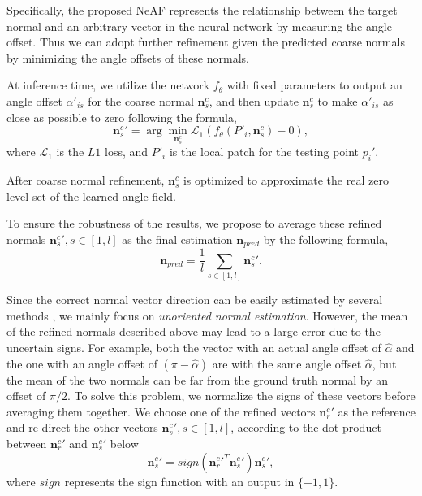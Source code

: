 \documentclass[letterpaper]{article} \usepackage{aaai23}  \usepackage{times}  \usepackage{helvet}  \usepackage{courier}  \usepackage[hyphens]{url}  \usepackage{graphicx} \urlstyle{rm} \def\UrlFont{\rm}  \usepackage{natbib}  \usepackage{caption} \frenchspacing  \setlength{\pdfpagewidth}{8.5in} \setlength{\pdfpageheight}{11in} \usepackage{algorithm}
\begin{document}
Specifically, the proposed NeAF represents the relationship between the target normal and an arbitrary vector in the neural network by measuring the angle offset. Thus we can adopt further refinement given the predicted coarse normals by minimizing the angle offsets of these normals.

At inference time, we utilize the network $f_{\theta}$ with fixed parameters to output an angle offset $\alpha'_{is} $ for the coarse normal $\boldsymbol{n}^c_s$, and then update $\boldsymbol{n}^c_s$ to make $\alpha'_{is}$ as close as possible to zero following the formula,
\begin{equation}
\label{eq:optimization}
    {\boldsymbol{n}^c_s}' = \arg \min \limits_{\boldsymbol{n}^c_s} \mathcal{L}_1(f_{\theta}(P'_i, \boldsymbol{n}^c_s)-0),
\end{equation}
where $\mathcal{L}_1$ is the $L1$ loss, and $P'_i$ is the local patch for the testing point $p_i'$.

After coarse normal refinement, $\boldsymbol{n}^c_s$ is optimized to approximate the real zero level-set of the learned angle field. 

To ensure the robustness of the results, we propose to average these refined normals ${{\boldsymbol{n}}^c_s}', s\in[1,l]$ as the final estimation $\boldsymbol{n}_{pred}$ by the following formula,
\begin{equation}
\label{eq:average coarse normals}
    \boldsymbol{n}_{pred} = \frac{1}{l}\sum_{s \in [1,l]}{{\boldsymbol{n}}^c_s}'.
\end{equation}

Since the correct normal vector direction can be easily estimated by several methods \cite{mullen2010signing,  wu2015deep, huang2019learning, metzer2021orienting}, we mainly focus on \emph{unoriented normal estimation}. However, the mean of the refined normals described above may lead to a large error due to the uncertain signs. For example, both the vector with an actual angle offset of $\hat{\alpha}$ and the one with an angle offset of $(\pi-\hat{\alpha})$ are with the same angle offset $\hat{\alpha}$, but the mean of the two normals can be far from the ground truth normal by an offset of $\pi/2$. To solve this problem, we normalize the signs of these vectors before averaging them together. We choose one of the refined vectors ${{\boldsymbol{n}}^c_r}'$ as the reference  and re-direct the other vectors ${{\boldsymbol{n}}^c_s}', s\in[1,l]$, according to the dot product between ${{\boldsymbol{n}}^c_r}'$ and ${{\boldsymbol{n}}^c_s}'$ below
\begin{equation}
\label{eq: sign}
    {{\boldsymbol{n}}^c_s}' = sign ({{{\boldsymbol{n}}^c_r}'}^T {{\boldsymbol{n}}^c_s}'){{\boldsymbol{n}}^c_s}',
\end{equation}
where $sign$ represents the sign function with an output in $\{-1, 1\}$.
\end{document}
